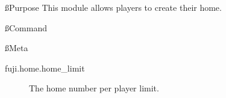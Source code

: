 
\ss{Purpose}
This module allows players to create their home.

\ss{Command}

\ss{Meta}
\begin{description}
    \item [fuji.home.home\_limit] The home number per player limit.
\end{description}

